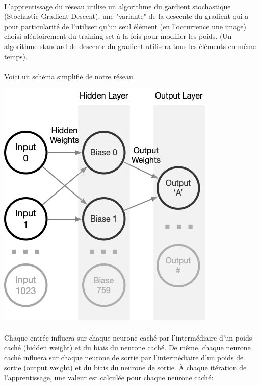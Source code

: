 \documentclass{article}
\begin{document}
\paragraph{}L'apprentissage du réseau utilise un algorithme du gardient stochastique (Stochastic Gradient Descent), une "variante" de la descente du gradient qui a pour particularité de l'utiliser qu'un seul élément (en l'occurrence une image) choisi aléatoirement du training-set à la fois pour modifier les poids. (Un algorithme standard de descente du gradient utilisera tous les éléments en même temps).

\paragraph{}Voici un schéma simplifié de notre réseau.


\begin{center}
	\includegraphics[scale=0.5]{Neuron}
\end{center}

\paragraph{} Chaque entrée influera sur chaque neurone caché par l’intermédiaire d’un poids caché (hidden weight) et du biais du neurone caché.
De même, chaque neurone caché influera sur chaque neurone de sortie par l’intermédiaire d’un poids de sortie (output weight) et du biais du neurone de sortie.
À chaque itération de l’apprentissage, une valeur est calculée pour chaque neurone caché:
\newline
\end{document}
